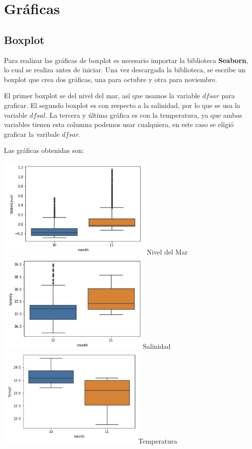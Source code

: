 \documentclass{article}
\begin{document}
\section{Gráficas}
\subsection{Boxplot}
Para realizar las gráficas de boxplot es necesario importar la biblioteca \textbf{Seaborn}, lo cual se realiza antes de iniciar. Una vez descargada la biblioteca, se escribe un boxplot que crea dos gráficas, una para octubre y otra para noviembre. 

El primer boxplot se del nivel del mar, así que usamos la variable $dfsar$ para graficar. El segundo boxplot es con respecto a la salinidad, por lo que se usa la variable $dfsal$. La tercera y última gráfica es con la temperatura, ya que ambas variables tienen esta columna podemos usar cualquiera, en este caso se eligió graficar la varibale $dfsar$.

Las gráficas obtenidas son:

	\begin{center}
    \includegraphics[height=5cm]{boxwat.png}{Nivel del Mar}
    \includegraphics[height=5cm]{boxsalt.png}{Salinidad}
    \includegraphics[height=5cm]{boxtemp.png}{Temperatura}
    \end{center}
\end{document}
